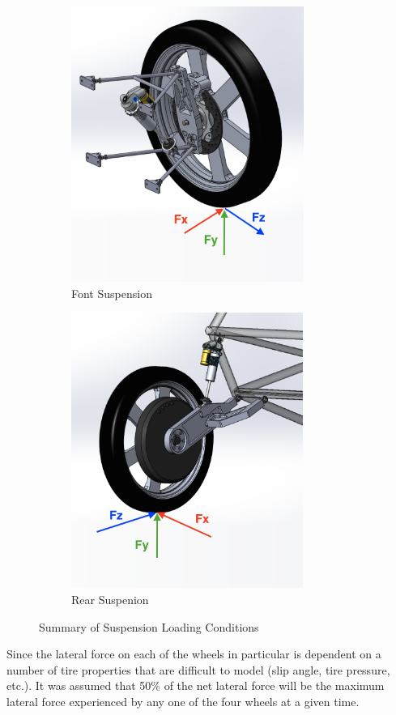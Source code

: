 \documentclass[12pt]{article}
\begin{document}
\begin{figure}[h!]
	\centering
    \begin{subfigure}[b]{.48\textwidth}
		\caption{Font Suspension}
		\centering
        \includegraphics[height=9cm]{./LaTex/frontIsoForces.PNG}
    \end{subfigure}
    \begin{subfigure}[b]{.48\textwidth}
		\caption{Rear Suspenion}
		\centering
        \includegraphics[height=9cm]{./LaTex/rearIsoForces.PNG}
    \end{subfigure}
    \caption{Summary of Suspension Loading Conditions}
	\label{fig:forcesSummary}
\end{figure}

Since the lateral force on each of the wheels in particular is dependent on a number of tire properties that are difficult to model (slip angle, tire pressure, etc.). It was assumed that 50\% of the net lateral force will be the maximum lateral force experienced by any one of the four wheels at a given time. 
\end{document}
